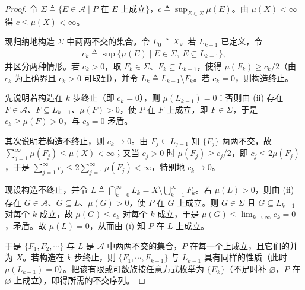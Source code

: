 \documentclass[../../main.tex]{subfiles}%
\begin{document}
\begin{proof}
令 $\Sigma\triangleq\{E\in\mathcal{A}\mid P\text{ 在 }E\text{ 上成立}\}$，$c\triangleq\sup_{E\in\Sigma}\mu(E)$。由 $\mu(X)<\infty$ 得 $c\leqslant\mu(X)<\infty$。

现归纳地构造 $\Sigma$ 中两两不交的集合。令 $L_0\triangleq X$。若 $L_{k-1}$ 已定义，令
\begin{align*}
c_k\triangleq\sup\{\mu(E)\mid E\in\Sigma,\ E\subseteq L_{k-1}\},
\end{align*}
并区分两种情形。若 $c_k>0$，取 $F_k\in\Sigma$、$F_k\subseteq L_{k-1}$，使得 $\mu(F_k)\geqslant c_k/2$（由 $c_k$ 为上确界且 $c_k>0$ 可取到），并令 $L_k\triangleq L_{k-1}\setminus F_k$。若 $c_k=0$，则构造终止。

先说明若构造在 $k$ 步终止（即 $c_k=0$），则 $\mu(L_{k-1})=0$：否则由 (ii) 存在 $F\in\mathcal{A}$、$F\subseteq L_{k-1}$、$\mu(F)>0$，使 $P$ 在 $F$ 上成立，即 $F\in\Sigma$，于是 $c_k\geqslant\mu(F)>0$，与 $c_k=0$ 矛盾。

其次说明若构造不终止，则 $c_k\to0$。由 $F_j\subseteq L_{j-1}$ 知 $\{F_j\}$ 两两不交，故 $\sum_{j=1}^\infty\mu(F_j)\leqslant\mu(X)<\infty$；又当 $c_j>0$ 时 $\mu(F_j)\geqslant c_j/2$，即 $c_j\leqslant2\mu(F_j)$，于是 $\sum_{j=1}^\infty c_j\leqslant2\sum_{j=1}^\infty\mu(F_j)<\infty$，特别地 $c_k\to0$。

现设构造不终止，并令 $L\triangleq\bigcap_{k=0}^\infty L_k=X\setminus\bigcup_{k=1}^\infty F_k$。若 $\mu(L)>0$，则由 (ii) 存在 $G\in\mathcal{A}$、$G\subseteq L$、$\mu(G)>0$，使 $P$ 在 $G$ 上成立。则 $G\in\Sigma$ 且 $G\subseteq L_{k-1}$ 对每个 $k$ 成立，故 $\mu(G)\leqslant c_k$ 对每个 $k$ 成立，于是 $\mu(G)\leqslant\lim_{k\to\infty}c_k=0$，矛盾。故 $\mu(L)=0$，从而由 (i) 知 $P$ 在 $L$ 上成立。

于是 $\{F_1,F_2,\cdots\}$ 与 $L$ 是 $\mathcal{A}$ 中两两不交的集合，$P$ 在每一个上成立，且它们的并为 $X$。若构造在 $k$ 步终止，则 $\{F_1,\cdots ,F_{k-1}\}$ 与 $L_{k-1}$ 具有同样的性质（此时 $\mu(L_{k-1})=0$）。把该有限或可数族按任意方式枚举为 $\{E_k\}$（不足时补 $\varnothing$，$P$ 在 $\varnothing$ 上成立），即得所需的不交序列。
\end{proof}
\end{document}
